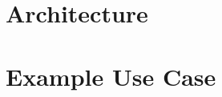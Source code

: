 \documentclass[conference,twoside]{IEEEtran}
\begin{document}
\section{Architecture}


\section{Example Use Case}


\end{document}
